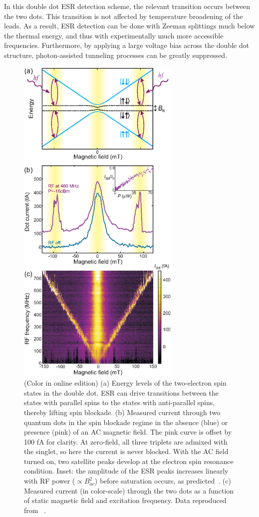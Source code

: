 \documentclass[rmp,twocolumn,aps]{revtex4}
\begin{document}
In this double dot ESR detection scheme, the relevant transition
occurs between the two dots. This transition is not affected by
temperature broadening of the leads. As a result, ESR detection
can be done with Zeeman splittings much below the thermal energy,
and thus with experimentally much more accessible frequencies.
Furthermore, by applying a large voltage bias across the double
dot structure, photon-assisted tunneling processes can be greatly
suppressed.

\begin{figure}[!htb]
\includegraphics[width=7.8cm]{hanson_fig43.eps}
\caption{(Color in online edition) (a) Energy levels of the two-electron spin states in the
double dot. ESR can drive transitions between the states with
parallel spins to the states with anti-parallel spins, thereby
lifting spin blockade. (b) Measured current through two quantum
dots in the spin blockade regime in the absence (blue) or presence
(pink) of an AC magnetic field. The pink curve is offset by 100 fA for clarity. 
At zero-field, all three triplets are admixed with the singlet, so here the current is never
blocked. With the AC field turned on, two satellite peaks develop
at the electron spin resonance condition. Inset: the amplitude of
the ESR peaks increases linearly with RF power ($\propto
B_{ac}^2$) before saturation occurs, as predicted~\cite{engel01}.
(c) Measured current (in color-scale) through the two dots as a
function of static magnetic field and excitation frequency. Data reproduced from ~\textcite{koppens06}.}
\label{fig:ESR_spectroscopy}
\end{figure}
\end{document}
